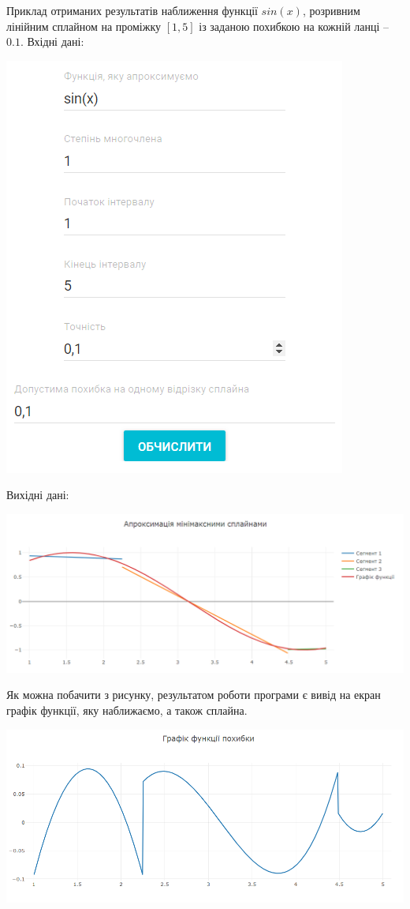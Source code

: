 \documentclass[ukrainian,14pt]{extarticle}
\begin{document}
Приклад отриманих результатів наближення функції $sin(x)$, розривним лінійним сплайном на проміжку $[1, 5]$ із заданою похибкою на кожній ланці – $0.1$. Вхідні дані:

\includegraphics[scale=1]{program_screenshots/form_example.png}

Вихідні дані:

\includegraphics[scale=0.6]{program_screenshots/approx_example_3_4.png}

Як можна побачити з рисунку, результатом роботи програми є вивід на екран графік функції, яку наближаємо, а також сплайна. 

\includegraphics[scale=0.6]{program_screenshots/error_example_3_4.png}
\end{document}
